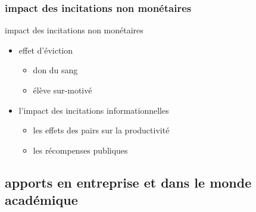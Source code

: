 \documentclass[serif]{beamer}
\begin{document}
\subsubsection{impact des incitations non monétaires}
\begin{frame}{impact des incitations non monétaires} 

\begin{itemize}
\item effet d'éviction
	\begin{itemize}
		\item don du sang
		\item élève sur-motivé
	\end{itemize}
\item  l’impact des incitations informationnelles 
	\begin{itemize}
		\item les effets des pairs sur la productivité
		\item les récompenses publiques
\end{itemize}
\end{itemize}




\end{frame}
\subsection{apports en entreprise et dans le monde académique}
\end{document}

